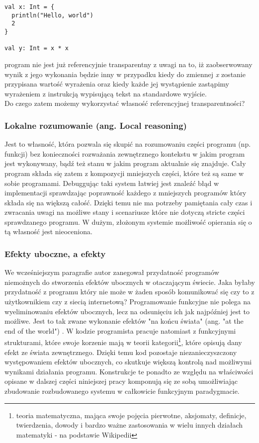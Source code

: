 \documentclass[../main.tex]{subfiles}
\begin{document}
\begin{lstlisting}[caption=Program który nie jest referencyjnie transparentny.]
val x: Int = {
  println("Hello, world")
  2
}

val y: Int = x * x
\end{lstlisting}
program nie jest już referencyjnie transparentny z uwagi na to, iż zaobserwowany wynik z jego wykonania będzie inny w przypadku kiedy do zmiennej \textit{x} zostanie przypisana wartość wyrażenia oraz kiedy każde jej wystąpienie zastąpimy wyrażeniem z instrukcją wypisującą tekst na standardowe wyjście.\\\vspace{4ex}
Do czego zatem możemy wykorzystać własność referencyjnej transparentności?

\subsubsection{Lokalne rozumowanie (ang. Local reasoning)}
Jest to własność, która pozwala się skupić na rozumowaniu części programu (np. funkcji) bez konieczności rozważania zewnętrznego kontekstu w jakim program jest wykonywany, bądź też stanu w jakim program aktualnie się znajduje. Cały program składa się zatem z kompozycji mniejszych części, które też są same w sobie programami. Debuggując taki system łatwiej jest znaleźć błąd w implementacji sprawdzając poprawność każdego z mniejszych programów który składa się na większą całość. Dzięki temu nie ma potrzeby pamiętania cały czas i zwracania uwagi na możliwe stany i scenariusze które nie dotyczą stricte części sprawdzanego programu. W dużym, złożonym systemie możliwość opierania się o tą własność jest nieoceniona.

\subsubsection{Efekty uboczne, a efekty}
We wcześniejszym paragrafie autor zanegował przydatność programów niemożnych do stworzenia efektów ubocznych w otaczającym świecie. Jaka byłaby przydatność z programu który nie może w żaden sposób komunikować się czy to z użytkownikiem czy z siecią internetową?\vspace{3ex}
Programowanie funkcyjne nie polega na wyeliminowaniu efektów ubocznych, lecz na odsunięciu ich jak najpóźniej jest to możliwe. Jest to tak zwane wykonanie efektów "na końcu świata" (ang. "at the end of the world") \cite{WEBSITE:Fabio}. W kodzie programista pracuje natomiast z funkcyjnymi strukturami, które swoje korzenie mają w teorii kategorii\footnote{teoria matematyczna, mająca swoje pojęcia pierwotne, aksjomaty, definicje, twierdzenia, dowody i bardzo ważne zastosowania w wielu innych działach matematyki - na podstawie Wikipedii}, które opisują dany efekt ze świata zewnętrznego. Dzięki temu kod pozostaje niezanieczyszczony występowaniem efektów ubocznych, co skutkuje większą kontrolą nad możliwymi wynikami działania programu. Konstrukcje te ponadto ze względu na właściwości opisane w dalszej części niniejszej pracy komponują się ze sobą umożliwiając zbudowanie rozbudowanego systemu w całkowicie funkcyjnym paradygmacie. 
\end{document}

